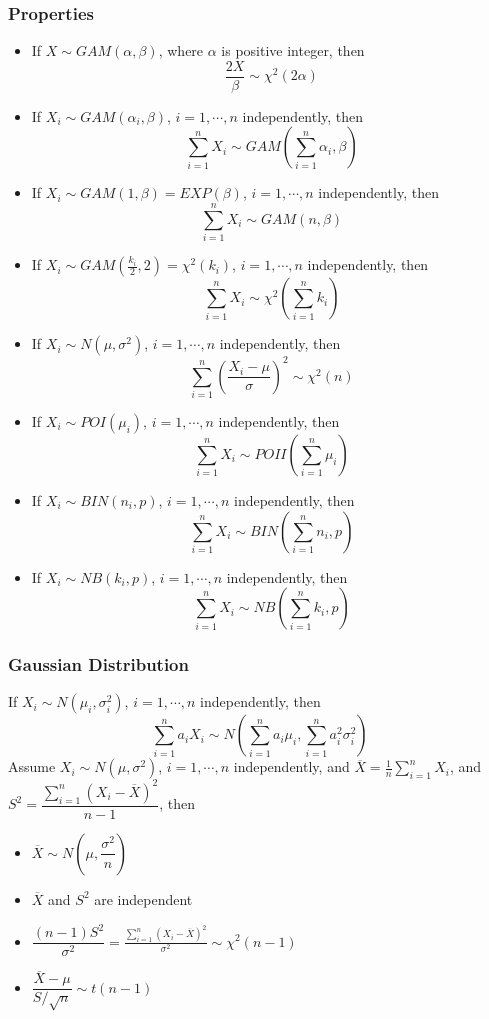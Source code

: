 \documentclass[11pt]{article}
\newcommand{\ds}{\displaystyle}
\begin{document}
\subsubsection{Properties}
\begin{itemize}
    \item If $X\sim GAM(\alpha,\beta)$, where $\alpha$ is positive integer, then \[\dfrac{2X}{\beta}\sim\chi^2(2\alpha)\]
    \item If $X_i\sim GAM(\alpha_i,\beta)$, $i=1,\cdots,n$ independently, then \[\sum_{i=1}^{n}X_i\sim GAM(\sum_{i=1}^{n}\alpha_i,\beta)\]
    \item If $X_i\sim GAM(1,\beta) = EXP(\beta)$, $i=1,\cdots,n$ independently, then \[\sum_{i=1}^{n}X_i\sim GAM(n,\beta)\]
    \item If $X_i\sim GAM(\frac{k_i}{2},2)=\chi^2(k_i)$, $i=1,\cdots,n$ independently, then \[\sum_{i=1}^{n}X_i\sim\chi^2(\sum_{i=1}^{n}k_i)\]
    \item If $X_i\sim N(\mu,\sigma^2)$, $i=1,\cdots,n$ independently, then \[\sum_{i=1}^{n}(\frac{X_i-\mu}{\sigma})^2 \sim \chi^2(n)\]
    \item If $X_i\sim POI(\mu_i)$, $i=1,\cdots,n$ independently, then \[\sum_{i=1}^{n}X_i\sim POII(\sum_{i=1}^{n}\mu_i)\]
    \item If $X_i\sim BIN(n_i,p)$, $i=1,\cdots,n$ independently, then \[\sum_{i=1}^{n}X_i\sim BIN(\sum_{i=1}^{n}n_i,p)\]
    \item If $X_i\sim NB(k_i,p)$, $i=1,\cdots,n$ independently, then \[\sum_{i=1}^{n}X_i\sim NB(\sum_{i=1}^{n}k_i,p)\]
\end{itemize}
\subsubsection{Gaussian Distribution}
If $X_i\sim N(\mu_i,\sigma_i^2)$, $i=1,\cdots,n$ independently, then
\[\sum_{i=1}^{n}a_iX_i\sim N(\sum_{i=1}^{n}a_i\mu_i,\sum_{i=1}^{n}a_i^2\sigma_i^2)\]
Assume $X_i\sim N(\mu,\sigma^2)$, $i=1,\cdots,n$ independently, and $\overline{X}=\ds\frac{1}{n}\sum_{i=1}^{n}X_{i}$, 
and $S^2 = \dfrac{\sum_{i=1}^{n}(X_i-\overline{X})^2}{n-1}$, then 
\begin{itemize}
    \item $\overline{X}\sim N(\mu,\dfrac{\sigma^2}{n})$
    \item $\overline{X}$ and $S^2$ are independent
    \item $\dfrac{(n-1)S^2}{\sigma^2}=\ds\frac{\sum_{i=1}^{n}(X_i-\overline{X})^2}{\sigma^2}\sim\chi^2(n-1)$
    \item $\dfrac{\overline{X}-\mu}{S/\sqrt{n}}\sim t(n-1)$
\end{itemize}
\end{document}
